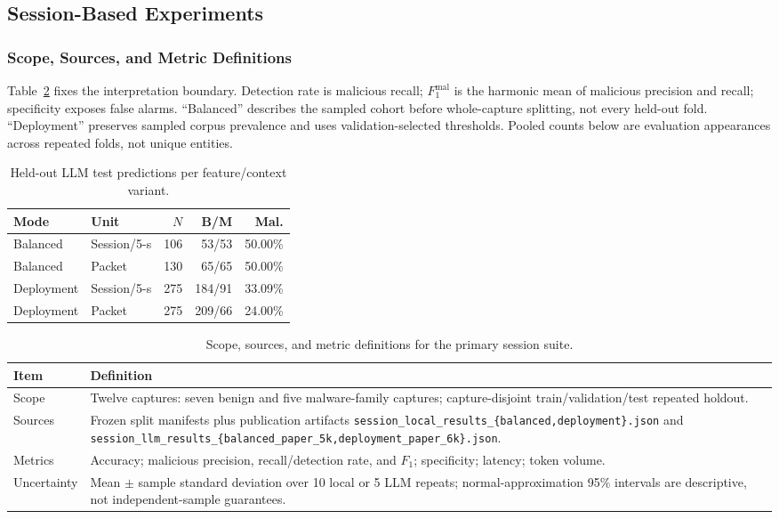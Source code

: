 \documentclass[letterpaper,twocolumn,10pt]{article}
\begin{document}
\subsection{Session-Based Experiments}

\subsubsection{Scope, Sources, and Metric Definitions}
Table~\ref{tab:session-scope} fixes the interpretation boundary. Detection rate is malicious recall; $F_1^{\mathrm{mal}}$ is the harmonic mean of malicious precision and recall; specificity exposes false alarms. ``Balanced'' describes the sampled cohort before whole-capture splitting, not every held-out fold. ``Deployment'' preserves sampled corpus prevalence and uses validation-selected thresholds. Pooled counts below are evaluation appearances across repeated folds, not unique entities.

\begin{table}[h]
\centering
\caption{Held-out LLM test predictions per feature/context variant.}
\label{tab:session-llm-subsets}
\footnotesize
\begin{tabular}{llrrr}
\toprule
Mode & Unit & $N$ & B/M & Mal. \\
\midrule
Balanced & Session/5-s & 106 & 53/53 & 50.00\% \\
Balanced & Packet & 130 & 65/65 & 50.00\% \\
Deployment & Session/5-s & 275 & 184/91 & 33.09\% \\
Deployment & Packet & 275 & 209/66 & 24.00\% \\
\bottomrule
\end{tabular}
\end{table}

\begin{table}[t]
\centering
\caption{Scope, sources, and metric definitions for the primary session suite.}
\label{tab:session-scope}
\footnotesize
\begin{tabularx}{\textwidth}{p{2.1cm}X}
\toprule
Item & Definition \\
\midrule
Scope & Twelve captures: seven benign and five malware-family captures; capture-disjoint train/validation/test repeated holdout. \\
Sources & Frozen split manifests plus publication artifacts \texttt{session\_local\_results\_\{balanced,deployment\}.json} and \texttt{session\_llm\_results\_\{balanced\_paper\_5k,deployment\_paper\_6k\}.json}. \\
Metrics & Accuracy; malicious precision, recall/detection rate, and $F_1$; specificity; latency; token volume. \\
Uncertainty & Mean $\pm$ sample standard deviation over 10 local or 5 LLM repeats; normal-approximation 95\% intervals are descriptive, not independent-sample guarantees. \\
\bottomrule
\end{tabularx}
\end{table}
\end{document}
